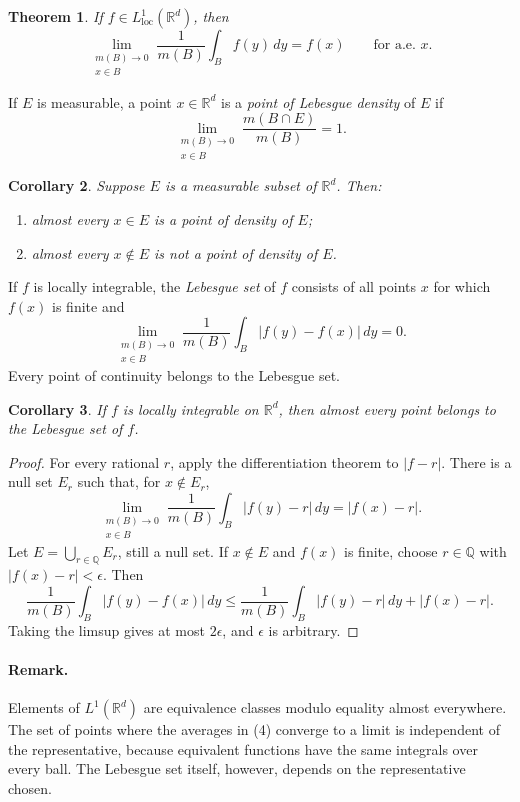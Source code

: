 \documentclass[11pt,openany]{book}
\newtheorem{theorem}{Theorem}[section]
\newtheorem{corollary}[theorem]{Corollary}
\begin{document}
\begin{theorem}
If $f\in L^1_{\mathrm{loc}}(\mathbb R^d)$, then
\[
\lim_{\substack{m(B)\to0\\x\in B}}
\frac1{m(B)}\int_Bf(y)\,dy=f(x)
\qquad\text{for a.e. }x.
\]
\end{theorem}

If $E$ is measurable, a point $x\in\mathbb R^d$ is a \emph{point of Lebesgue density} of $E$ if
\[
\lim_{\substack{m(B)\to0\\x\in B}}
\frac{m(B\cap E)}{m(B)}=1.
\]

\begin{corollary}
Suppose $E$ is a measurable subset of $\mathbb R^d$. Then:
\begin{enumerate}
\item[(i)] almost every $x\in E$ is a point of density of $E$;
\item[(ii)] almost every $x\notin E$ is not a point of density of $E$.
\end{enumerate}
\end{corollary}

If $f$ is locally integrable, the \emph{Lebesgue set} of $f$ consists of all points $x$ for which $f(x)$ is finite and
\[
\lim_{\substack{m(B)\to0\\x\in B}}
\frac1{m(B)}\int_B|f(y)-f(x)|\,dy=0.
\]
Every point of continuity belongs to the Lebesgue set.

\begin{corollary}
If $f$ is locally integrable on $\mathbb R^d$, then almost every point belongs to the Lebesgue set of $f$.
\end{corollary}

\begin{proof}
For every rational $r$, apply the differentiation theorem to $|f-r|$. There is a null set $E_r$ such that, for $x\notin E_r$,
\[
\lim_{\substack{m(B)\to0\\x\in B}}
\frac1{m(B)}\int_B|f(y)-r|\,dy=|f(x)-r|.
\]
Let $E=\bigcup_{r\in\mathbb Q}E_r$, still a null set. If $x\notin E$ and $f(x)$ is finite, choose $r\in\mathbb Q$ with $|f(x)-r|<\epsilon$. Then
\[
\frac1{m(B)}\int_B|f(y)-f(x)|\,dy
\le \frac1{m(B)}\int_B|f(y)-r|\,dy+|f(x)-r|.
\]
Taking the limsup gives at most $2\epsilon$, and $\epsilon$ is arbitrary.
\end{proof}

\paragraph{Remark.}
Elements of $L^1(\mathbb R^d)$ are equivalence classes modulo equality almost everywhere. The set of points where the averages in (4) converge to a limit is independent of the representative, because equivalent functions have the same integrals over every ball. The Lebesgue set itself, however, depends on the representative chosen.
\end{document}
